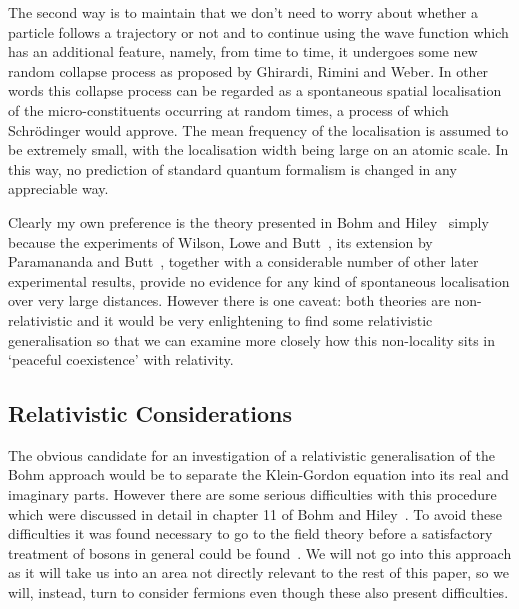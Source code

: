 \documentclass[12pt]{article}
\begin{document}
 The second way is to maintain that we don't need to worry about whether a particle follows a trajectory or not and to continue using the wave function which has an additional feature, namely, from time to time, it undergoes some new random collapse process as proposed by Ghirardi, Rimini and Weber\cite{grw86}.
In other words this collapse process can be regarded as a spontaneous spatial localisation of the micro-constituents occurring at random times, a process of which Schr\"{o}dinger would approve. The mean frequency of the localisation is assumed to be extremely small, with the localisation width being large on an atomic scale. In this way, no prediction of standard quantum formalism is changed in any appreciable way.

Clearly my own preference is the theory presented in Bohm and Hiley~\cite{dbbh93} simply because the experiments of Wilson, Lowe and Butt~\cite{awjldb67}, its extension by Paramananda and Butt~\cite{vpdb87}, together with a considerable number of other later experimental results, provide no evidence for any kind of spontaneous localisation over very large distances.  However there is one caveat: both theories are non-relativistic and it would be very enlightening to find some relativistic generalisation so that we can examine more closely how this non-locality sits in `peaceful coexistence' with relativity.

\subsection{Relativistic Considerations}

The obvious candidate for an investigation of a relativistic generalisation of the Bohm approach would be to separate the Klein-Gordon equation into its real and imaginary parts. However there are some serious difficulties  with this procedure which were discussed in detail in chapter 11 of Bohm and Hiley~\cite{dbbh93}.  To avoid these difficulties it was found necessary to go to the field theory before a satisfactory treatment of bosons in general could be found~\cite{dbbhpk87, pk94}. 
We will not go into this approach as it will take us into an area not directly relevant to the rest of this paper, so we will, instead, turn to consider fermions even though these also  present difficulties. 
\end{document}
